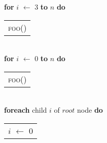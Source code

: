 \documentclass[letterpaper]{article}
\begin{document}
\textbf{for} $i$ $\leftarrow$ 3 \textbf{to} $n$ \textbf{do}\\
\begin{tabular}{@{\hskip 0.1em}|@{\hskip 1em}l}
\textsc{foo}()\\
\end{tabular}\\
\textbf{for} $i$ $\leftarrow$ 0 \textbf{to} $n$ \textbf{do}\\
\begin{tabular}{@{\hskip 0.1em}|@{\hskip 1em}l}
\textsc{foo}()\\
\end{tabular}\\
\textbf{foreach} child $i$ of $root$ node \textbf{do}\\
\begin{tabular}{@{\hskip 0.1em}|@{\hskip 1em}l}
$i$ $\leftarrow$ 0\\
\end{tabular}\\
\end{document}
